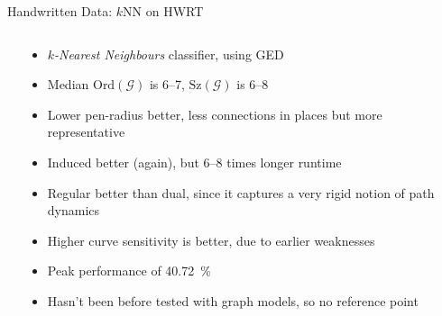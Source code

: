 \documentclass[10pt]{beamer}
\begin{document}
\begin{frame}{Handwritten Data: $k$NN on HWRT}
\begin{columns}
\begin{column}{0.3\textwidth}
		\vspace{-2.5em}
		\begin{table}
			\centering
			\vspace{-0.5em}
			\caption{
				Curve Sensitivity (Regular, Induced, $r=1$)
			}
		\end{table}
	\end{column}
	\begin{column}{0.7\textwidth}
		\vspace{-3em}
		\begin{itemize}
			\item \emph{$k$-Nearest Neighbours} classifier, using GED
			\item Median $\text{Ord}(\mathcal{G})$ is 6--7, $\text{Sz}(\mathcal{G})$ is 6--8
			\item Lower pen-radius better, less connections in places but more representative
			\item Induced better (again), but 6--8 times longer runtime
			\item Regular better than dual, since it captures a very rigid notion of path dynamics
			\item Higher curve sensitivity is better, due to earlier weaknesses
			\item \alert{Peak performance of \SI{40.72}{\percent}}
			\item Hasn't been before tested with graph models, so no reference point
		\end{itemize}
	\end{column}
\end{columns}
\end{frame}
\end{document}
